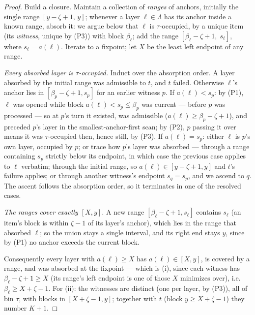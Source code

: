 \begin{proof}
Build a closure. Maintain a collection of \emph{ranges} of anchors,
initially the single range $[y-\zeta+1,\, y]$; whenever a layer
$\ell \in \Lambda$ has its anchor inside a known range, absorb it: we argue
below that $\ell$ is $\tau$-occupied, by a unique item (its \emph{witness},
unique by (P3)) with block $\beta_\ell$; add the range
$[\beta_\ell - \zeta + 1,\; s_\ell]$, where $s_\ell = a(\ell)$. Iterate to a
fixpoint; let $X$ be the least left endpoint of any range.

\emph{Every absorbed layer is $\tau$-occupied.} Induct over the absorption
order. A layer absorbed by the initial range was admissible to $t$, and $t$
failed. Otherwise $\ell$'s anchor lies in $[\beta_p - \zeta + 1, s_p]$ for
an earlier witness $p$. If $a(\ell) < s_p$: by (P1), $\ell$ was opened while
block $a(\ell) < s_p \le \beta_p$ was current --- before $p$ was processed
--- so at $p$'s turn it existed, was admissible
($a(\ell) \ge \beta_p - \zeta + 1$), and preceded $p$'s layer in the
smallest-anchor-first scan; by (P2), $p$ passing it over means it was
$\tau$-occupied then, hence still, by (P3). If $a(\ell) = s_p$: either
$\ell$ is $p$'s own layer, occupied by $p$; or trace how $p$'s layer was
absorbed --- through a range containing $s_p$ strictly below its endpoint,
in which case the previous case applies to $\ell$ verbatim; through the
initial range, so $a(\ell) \in [y-\zeta+1, y]$ and $t$'s failure applies; or
through another witness's endpoint $s_q = s_p$, and we ascend to $q$. The
ascent follows the absorption order, so it terminates in one of the resolved
cases.

\emph{The ranges cover exactly $[X, y]$.} A new range
$[\beta_\ell - \zeta + 1, s_\ell]$ contains $s_\ell$ (an item's block is
within $\zeta - 1$ of its layer's anchor), which lies in the range that
absorbed $\ell$; so the union stays a single interval, and its right end
stays $y$, since by (P1) no anchor exceeds the current block.

Consequently every layer with $a(\ell) \ge X$ has $a(\ell) \in [X, y]$, is
covered by a range, and was absorbed at the fixpoint --- which is (i), since
each witness has $\beta_\ell - \zeta + 1 \ge X$ (its range's left endpoint
is one of those $X$ minimizes over), i.e.
$\beta_\ell \ge X + \zeta - 1$. For (ii): the witnesses are distinct (one
per layer, by (P3)), all of bin $\tau$, with blocks in $[X+\zeta-1, y]$;
together with $t$ (block $y \ge X + \zeta - 1$) they number $K + 1$.
\end{proof}

